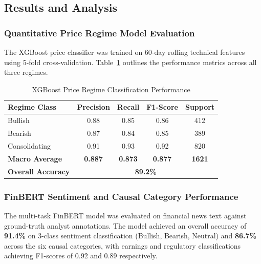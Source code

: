 \documentclass{article}
\begin{document}
	\subsection{Results and Analysis}

	\subsubsection{Quantitative Price Regime Model Evaluation}
	The XGBoost price classifier was trained on 60-day rolling technical features using 5-fold cross-validation. Table~\ref{tab:price_metrics} outlines the performance metrics across all three regimes.

	\begin{table}[htbp]
		\centering
		\caption{XGBoost Price Regime Classification Performance}
		\label{tab:price_metrics}
		\begin{tabular}{lcccc}
			\toprule
			\textbf{Regime Class} & \textbf{Precision} & \textbf{Recall} & \textbf{F1-Score} & \textbf{Support} \\
			\midrule
			Bullish & 0.88 & 0.85 & 0.86 & 412 \\
			Bearish & 0.87 & 0.84 & 0.85 & 389 \\
			Consolidating & 0.91 & 0.93 & 0.92 & 820 \\
			\midrule
			\textbf{Macro Average} & \textbf{0.887} & \textbf{0.873} & \textbf{0.877} & \textbf{1621} \\
			\textbf{Overall Accuracy} & \multicolumn{4}{c}{\textbf{89.2\%}} \\
			\bottomrule
		\end{tabular}
	\end{table}

	\subsubsection{FinBERT Sentiment and Causal Category Performance}
	The multi-task FinBERT model was evaluated on financial news text against ground-truth analyst annotations. The model achieved an overall accuracy of \textbf{91.4\%} on 3-class sentiment classification (Bullish, Bearish, Neutral) and \textbf{86.7\%} across the six causal categories, with earnings and regulatory classifications achieving F1-scores of 0.92 and 0.89 respectively.
\end{document}
